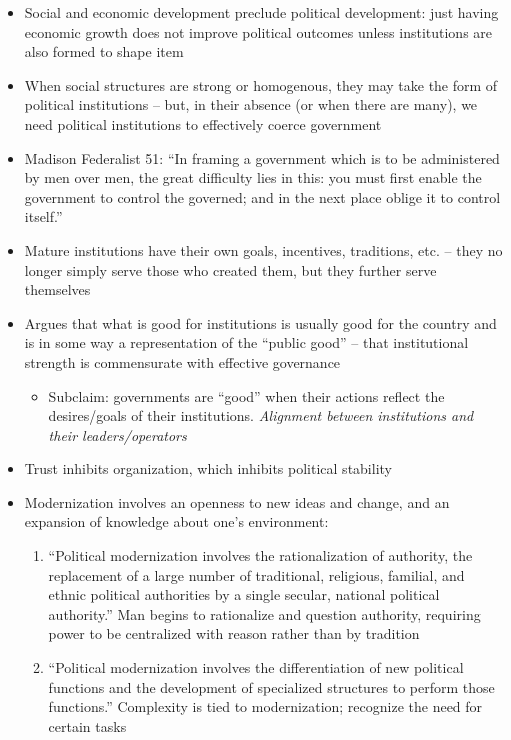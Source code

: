 \documentclass[12pt]{article}
\begin{document}
\begin{itemize}[leftmargin=*, itemsep=4pt]
    \item Social and economic development preclude political development: just having economic growth does not improve political outcomes unless institutions are also formed to shape item
    \item When social structures are strong or homogenous, they may take the form of political institutions -- but, in their absence (or when there are many), we need political institutions to effectively coerce government
    \item Madison Federalist 51: ``In framing a government which is to be administered by men over men, the great difficulty lies in this: you must first enable the government to control the governed; and in the next place oblige it to control itself.''
    \item Mature institutions have their own goals, incentives, traditions, etc. -- they no longer simply serve those who created them, but they further serve themselves
    \item Argues that what is good for institutions is usually good for the country and is in some way a representation of the ``public good'' -- that institutional strength is commensurate with effective governance
     \begin{itemize}
        \item Subclaim: governments are ``good'' when their actions reflect the desires/goals of their institutions. \emph{Alignment between institutions and their leaders/operators }
    \end{itemize}
    \item Trust inhibits organization, which inhibits political stability
    \item Modernization involves an openness to new ideas and change, and an expansion of knowledge about one's environment:
    \begin{enumerate}
        \item  ``Political modernization involves the rationalization of authority, the replacement of a large number of traditional, religious, familial, and ethnic political authorities by a single secular, national political authority.'' Man begins to rationalize and question authority, requiring power to be centralized with reason rather than by tradition
        \item ``Political modernization involves the differentiation of new political functions and the development of specialized structures to perform those functions.'' Complexity is tied to modernization; recognize the need for certain tasks

\end{enumerate}
\end{itemize}
\end{document}
